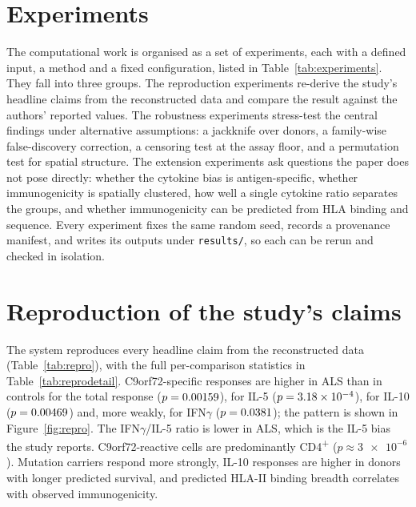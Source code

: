 \documentclass[11pt]{article}
\begin{document}
\section{Experiments}
The computational work is organised as a set of experiments, each with a defined input, a method and a
fixed configuration, listed in Table~\ref{tab:experiments}. They fall into three groups. The
reproduction experiments re-derive the study's headline claims from the reconstructed data and compare
the result against the authors' reported values. The robustness experiments stress-test the central
findings under alternative assumptions: a jackknife over donors, a family-wise false-discovery
correction, a censoring test at the assay floor, and a permutation test for spatial structure. The
extension experiments ask questions the paper does not pose directly: whether the cytokine bias is
antigen-specific, whether immunogenicity is spatially clustered, how well a single cytokine ratio
separates the groups, and whether immunogenicity can be predicted from HLA binding and sequence. Every
experiment fixes the same random seed, records a provenance manifest, and writes its outputs under
\texttt{results/}, so each can be rerun and checked in isolation.

\begin{table}[t]
\centering
\caption{The computational experiments, with their setup, statistical method and configuration.}
\label{tab:experiments}
\footnotesize

\end{table}

\section{Reproduction of the study's claims}
The system reproduces every headline claim from the reconstructed data (Table~\ref{tab:repro}), with
the full per-comparison statistics in Table~\ref{tab:reprodetail}.
C9orf72-specific responses are higher in ALS than in controls for the total response
($p=0.00159{}$), for IL-5 ($p=\num{3.18e-04}{}$), for IL-10 ($p=0.00469{}$) and, more
weakly, for IFN$\gamma$ ($p=0.0381{}$); the pattern is shown in Figure~\ref{fig:repro}. The
IFN$\gamma$/IL-5 ratio is lower in ALS, which is the IL-5 bias the study reports. C9orf72-reactive
cells are predominantly CD4\textsuperscript{+} ($p\approx\num{3e-6}$). Mutation carriers respond
more strongly, IL-10 responses are higher in donors with longer predicted survival, and predicted
HLA-II binding breadth correlates with observed immunogenicity.
\end{document}
